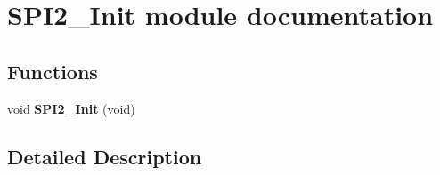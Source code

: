 \hypertarget{group___s_p_i2___init__module}{}\section{S\+P\+I2\+\_\+\+Init module documentation}
\label{group___s_p_i2___init__module}
\subsection*{Functions}
\begin{DoxyCompactItemize}
\item 
void {\bfseries S\+P\+I2\+\_\+\+Init} (void)\hypertarget{group___s_p_i2___init__module_ga5b870155c01678a2480ede985cc4383f}{}\label{group___s_p_i2___init__module_ga5b870155c01678a2480ede985cc4383f}

\end{DoxyCompactItemize}


\subsection{Detailed Description}
